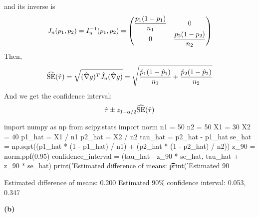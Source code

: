 and its inverse is
\[
J_{n}(p_{1}, p_{2}) = I_{n}^{-1}(p_{1}, p_{2}) = 
\begin{pmatrix} 
\displaystyle\frac{p_{1}(1 - p_{1})}{n_{1}} & 0 \\
0 & \displaystyle\frac{p_{2}(1 - p_{2})}{n_{2}}
\end{pmatrix}
\]
Then,
\[
\widehat{\operatorname{\mathrm{SE}}}(\hat{\tau}) = \sqrt{(\hat{\nabla}g)^T \hat{J}_{n} (\hat{\nabla}g)}
= \sqrt{\frac{\hat{p}_{1}(1 - \hat{p}_{1})}{n_{1}} + \frac{\hat{p}_{2}(1 - \hat{p}_{2})}{n_{2}}}
\]
And we get the confidence interval:
\[
\hat{\tau} \pm z_{1 - \alpha/2}\widehat{\operatorname{\mathrm{SE}}}(\hat{\tau})
\]

\begin{python}
import numpy as np
from scipy.stats import norm
n1 = 50
n2 = 50
X1 = 30
X2 = 40
p1_hat = X1 / n1
p2_hat = X2 / n2
tau_hat = p2_hat - p1_hat
se_hat = np.sqrt((p1_hat * (1 - p1_hat) / n1) + (p2_hat * (1 - p2_hat) / n2))
z_90 = norm.ppf(0.95)
confidence_interval = (tau_hat - z_90 * se_hat, tau_hat + z_90 * se_hat)
print('Estimated difference of means: \t\t %
print('Estimated 90%
\end{python}
\begin{console}
Estimated difference of means:           0.200
Estimated 90\% confidence interval:       0.053, 0.347
\end{console}
\textbf{(b)}


